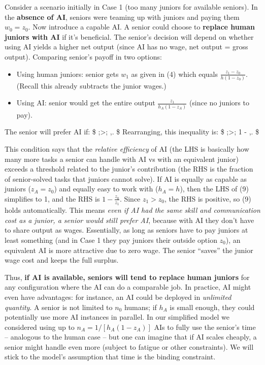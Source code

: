 \documentclass[12pt]{article}
\begin{document}
Consider a scenario initially in Case 1 (too many juniors for available
seniors). In the \textbf{absence of AI}, seniors were teaming up with
juniors and paying them \(w_0 = z_0\). Now introduce a capable AI. A
senior could choose to \textbf{replace human juniors with AI} if it's
beneficial. The senior's decision will depend on whether using AI yields
a higher net output (since AI has no wage, net output = gross output).
Comparing senior's payoff in two options:

\begin{itemize}
\tightlist
\item
  Using human juniors: senior gets \(w_1\) as given in (4) which equals
  \(\frac{z_1 - z_0}{h(1-z_0)}\). (Recall this already subtracts the
  junior wages.)
\item
  Using AI: senior would get the entire output
  \(\frac{z_1}{h_A(1-z_A)}\) (since no juniors to pay).
\end{itemize}

The senior will prefer AI if: \$ 
;\textgreater; ,. \$ Rearranging,
this inequality is: \$  ;\textgreater; 1
- ,. \$

This condition says that the \emph{relative efficiency} of AI (the LHS
is basically how many more tasks a senior can handle with AI vs with an
equivalent junior) exceeds a threshold related to the junior's
contribution (the RHS is the fraction of senior-solved tasks that
juniors cannot solve). If AI is equally as capable as juniors
(\(z_A = z_0\)) and equally easy to work with (\(h_A = h\)), then the
LHS of (9) simplifies to 1, and the RHS is \(1 - \frac{z_0}{z_1}\).
Since \(z_1 > z_0\), the RHS is positive, so (9) holds automatically.
This means \emph{even if AI had the same skill and communication cost as
a junior, a senior would still prefer AI}, because with AI they don't
have to share output as wages. Essentially, as long as seniors have to
pay juniors at least something (and in Case 1 they pay juniors their
outside option \(z_0\)), an equivalent AI is more attractive due to zero
wage. The senior ``saves'' the junior wage cost and keeps the full
surplus.

Thus, \textbf{if AI is available, seniors will tend to replace human
juniors} for any configuration where the AI can do a comparable job. In
practice, AI might even have advantages: for instance, an AI could be
deployed in \emph{unlimited quantity}. A senior is not limited to
\(n_0\) humans; if \(h_A\) is small enough, they could potentially use
more AI instances in parallel. In our simplified model we considered
using up to \(n_A = 1/[h_A(1-z_A)]\) AIs to fully use the senior's time
-- analogous to the human case -- but one can imagine that if AI scales
cheaply, a senior might handle even more (subject to fatigue or other
constraints). We will stick to the model's assumption that time is the
binding constraint.
\end{document}
